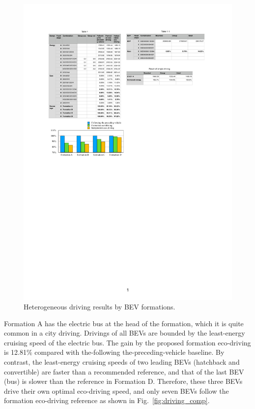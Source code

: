 \documentclass{IEEEtran}
\begin{document}
\begin{figure}	%
\centering
\includegraphics[width=1.0\hsize]{Figures/Bar_graph.pdf}
\caption{Heterogeneous driving results by BEV formations.}
\label{fig:bar_graph}
\end{figure} 



Formation A has the electric bus at the head of the formation, which it is quite common in a city driving. Drivings of all BEVs are bounded by the least-energy cruising speed of the electric bus. The gain by the proposed formation eco-driving is 12.81\% compared with the-following the-preceding-vehicle baseline.
By contrast, the least-energy cruising speeds of two leading BEVs (hatchback and convertible) are faster than a recommended reference, and that of the last BEV (bus) is slower than the reference in Formation D. Therefore, these three BEVs drive their own optimal eco-driving speed, and only seven BEVs follow the formation eco-driving reference as shown in Fig.~\ref{fig:driving_comp}.
\end{document}
